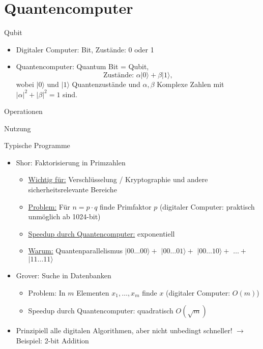 \section{Quantencomputer}

\begin{defi}[Quantencomputer]{Qubit}
    \begin{itemize}
        \item Digitaler Computer: Bit, Zustände: 0 oder 1
        \item Quantencomputer: Quantum Bit = Qubit,
              $$\text{Zustände: } \alpha|0\rangle + \beta|1\rangle,$$
              wobei $|0\rangle$ und $|1\rangle$ Quantenzustände und
              $\alpha, \beta$ Komplexe Zahlen mit $|\alpha|^2 + |\beta|^2 = 1$ sind.
    \end{itemize}
\end{defi}

\begin{defi}[Quantencomputer]{Operationen}

\end{defi}

\begin{defi}[Quantencomputer]{Nutzung}

\end{defi}

\begin{defi}[Quantencomputer]{Typische Programme}
    \begin{itemize}
        \item Shor: Faktorisierung in Primzahlen
              \begin{itemize}
                  \item \underline{Wichtig für:} Verschlüsselung / Kryptographie und andere sicherheitsrelevante Bereiche
                  \item \underline{Problem:} Für $n=p\cdot q$ finde Primfaktor $p$
                        (digitaler Computer: praktisch unmöglich ab 1024-bit)
                  \item \underline{Speedup durch Quantencomputer:} exponentiell
                  \item \underline{Warum:} Quantenparallelismus $|00\ldots00\rangle+$ $|00\ldots01\rangle+$ $|00\ldots10\rangle+$ $\ldots+$ $|11\ldots11\rangle$
              \end{itemize}
        \item Grover: Suche in Datenbanken
              \begin{itemize}
                  \item Problem: In $m$ Elementen $x_1, \ldots, x_m$ finde $x$ (digitaler Computer: $O(m)$)
                  \item Speedup durch Quantencomputer: quadratisch $O(\sqrt{m})$
              \end{itemize}
        \item Prinzipiell alle digitalen Algorithmen, aber nicht unbedingt schneller! $\to$ Beispiel: 2-bit Addition
    \end{itemize}
\end{defi}

